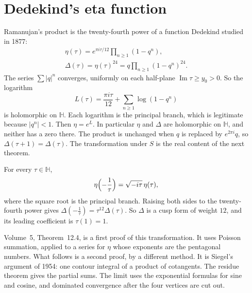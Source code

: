 \section{Dedekind's eta function}

Ramanujan's product is the twenty-fourth power of a function Dedekind studied in 1877:
\[
\begin{gathered}\eta(\tau)=e^{\pi i\tau/12}\prod_{n\ge1}(1-q^n),\\\Delta(\tau)=\eta(\tau)^{24}=q\prod_{n\ge1}(1-q^n)^{24}.\end{gathered}
\]
The series $\sum|q|^n$ converges, uniformly on each half-plane $\operatorname{Im}\tau\ge y_0>0$. So the logarithm
\[
L(\tau)=\frac{\pi i\tau}{12}+\sum_{n\ge1}\log(1-q^n)
\]
is holomorphic on $\mathbb H$. Each logarithm is the principal branch, which is legitimate because $|q^n|<1$. Then $\eta=e^L$. In particular $\eta$ and $\Delta$ are holomorphic on $\mathbb H$, and neither has a zero there. The product is unchanged when $q$ is replaced by $e^{2\pi i}q$, so $\Delta(\tau+1)=\Delta(\tau)$. The transformation under $S$ is the real content of the next theorem.

\begin{theorem}[Dedekind]\label{thm:eta}
For every $\tau\in\mathbb H$,
\[
\eta\Bigl(-\frac1\tau\Bigr)=\sqrt{-i\tau}\,\eta(\tau),
\]
where the square root is the principal branch. Raising both sides to the twenty-fourth power gives $\Delta(-\frac1\tau)=\tau^{12}\Delta(\tau)$. So $\Delta$ is a cusp form of weight $12$, and its leading coefficient is $\tau(1)=1$.
\end{theorem}

Volume~5, Theorem~12.4, is a first proof of this transformation. It uses Poisson summation, applied to a series for $\eta$ whose exponents are the pentagonal numbers. What follows is a second proof, by a different method. It is Siegel's argument of 1954: one contour integral of a product of cotangents. The residue theorem gives the partial sums. The limit uses the exponential formulas for sine and cosine, and dominated convergence after the four vertices are cut out.

